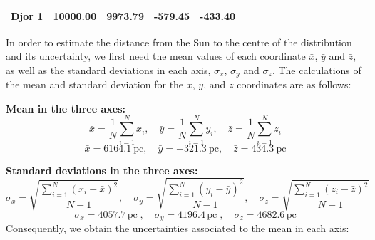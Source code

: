 \begin{description}
\begin{center}
\begin{tabular}{|l|r|r|r|r|}
  Djor 1      & 10000.00 &  9973.79 &  -579.45 &  -433.40\\
  \hline
  \end{tabular}
  \end{center}
\item[(b)] In order to estimate the distance from the Sun to the centre of
  the distribution and its uncertainty, we first need the mean values of each
  coordinate $\bar{x}$, $\bar{y}$ and $\bar{z}$, as well as the standard
  deviations in each axis, $\sigma_x$, $\sigma_y$ and $\sigma_z$. The
  calculations of the mean and standard deviation for the $x$, $y$, and $z$
  coordinates are as follows:

  \textbf{Mean in the three axes:}
  \[
    \bar{x} = \frac{1}{N}\sum_{i=1}^{N}x_i,\quad
    \bar{y} = \frac{1}{N}\sum_{i=1}^{N}y_i,\quad
    \bar{z} = \frac{1}{N}\sum_{i=1}^{N}z_i
  \]
  \[
    \bar{x} = 6164.1\ \mathrm{pc},\quad
    \bar{y} = -321.3\ \mathrm{pc},\quad
    \bar{z} = 434.3\ \mathrm{pc}
  \]

  \textbf{Standard deviations in the three axes:}
  \[
    \sigma_x = \sqrt{\frac{\sum_{i=1}^{N}(x_i-\bar{x})^2}{N-1}},\quad
    \sigma_y = \sqrt{\frac{\sum_{i=1}^{N}(y_i-\bar{y})^2}{N-1}},\quad
    \sigma_z = \sqrt{\frac{\sum_{i=1}^{N}(z_i-\bar{z})^2}{N-1}}
  \]
  \[
    \sigma_x = 4057.7\,\mathrm{pc}\;,\quad
    \sigma_y = 4196.4\,\mathrm{pc}\;,\quad
    \sigma_z = 4682.6\,\mathrm{pc}
  \]
  Consequently, we obtain the uncertainties associated to the mean in each
  axis:


\end{description}
